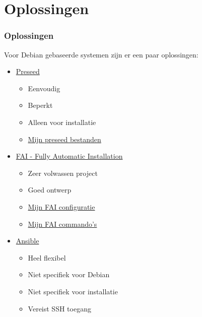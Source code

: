\documentclass{beamer}
\begin{document}
\section{Oplossingen}
\begin{frame}
\frametitle{Oplossingen}
Voor Debian gebaseerde systemen zijn er een paar oplossingen:
\begin{itemize}
  \item \href{https://wiki.debian.org/DebianInstaller/Preseed}{Preseed} 
  \begin{itemize}
    \item Eenvoudig
    \item Beperkt
    \item Alleen voor installatie
    \item \href{https://slspeek.github.io/debian/}{Mijn preseed bestanden}
  \end{itemize}
  \item \href{https://fai-project.org/}{FAI - Fully Automatic Installation}
  \begin{itemize}
     \item Zeer volwassen project
     \item Goed ontwerp
     \item \href{https://slspeek.github.io/fai/}{Mijn FAI configuratie}
     \item \href{https://slspeek.github.io/fai-cmds/}{Mijn FAI commando's} 
  \end{itemize}
  \item \href{https://ansible.com/}{Ansible}
  \begin{itemize}
     \item Heel flexibel
     \item Niet specifiek voor Debian
     \item Niet specifiek voor installatie
     \item Vereist SSH toegang
  \end{itemize}
\end{itemize}
\end{frame}
\end{document}
